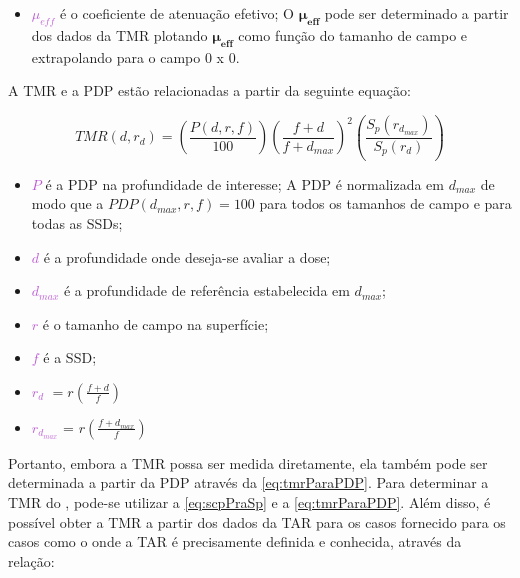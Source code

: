 \documentclass[11pt,a4paper]{article}
\newcounter{exemplo}
\begin{document}
    \begin{exemplo}[onde:]
        \begin{itemize}
            \item \textcolor{MediumOrchid}{$\mu_{eff}$} é o coeficiente de atenuação efetivo; O $\mathbf{\mu_{eff}}$ pode ser determinado a partir dos dados da TMR plotando $\mathbf{\mu_{eff}}$ como função do tamanho de campo e extrapolando para o campo 0 x 0. 
        \end{itemize}
    \end{exemplo}

    A TMR e a PDP estão relacionadas a partir da seguinte equação:

        \begin{equation}
            TMR(d, r_d) = \left(\frac{P(d, r, f)}{100}\right)\left(\frac{f + d}{f + d_{max}}\right)^2 \left(\frac{S_p(r_{d_{max}})}{S_p(r_{d})}\right)
            \label{eq:tmrParaPDP}
        \end{equation}

        \begin{exemplo}[onde:]
            \begin{itemize}
                \item \textcolor{MediumOrchid}{$P$} é a PDP na profundidade de interesse; A PDP é normalizada em $d_{max}$ de modo que a $PDP(d_{max}, r, f) = 100$ para todos os tamanhos de campo e para todas as SSDs;
                \item \textcolor{MediumOrchid}{$d$} é a profundidade onde deseja-se avaliar a dose;
                \item \textcolor{MediumOrchid}{$d_{max}$} é a profundidade de referência estabelecida em $d_{max}$; 
                \item \textcolor{MediumOrchid}{$r$} é o tamanho de campo na superfície;
                \item \textcolor{MediumOrchid}{$f$} é a SSD;
                \item \textcolor{MediumOrchid}{$r_d$} $= r \left(\frac{f + d}{f}\right)$
                \item \textcolor{MediumOrchid}{$r_{d_{max}}$} = $r\left(\frac{f + d_{max}}{f}\right)$
            \end{itemize}
        \end{exemplo}

    Portanto, embora a TMR possa ser medida diretamente, ela também pode ser determinada a partir da PDP através da \ref{eq:tmrParaPDP}. Para determinar a TMR do , pode-se utilizar a \ref{eq:scpPraSp}  e a \ref{eq:tmrParaPDP}. Além disso, é possível obter a TMR a partir dos dados da TAR para os casos fornecido para os casos como o  onde a TAR é precisamente definida e conhecida, através da relação:
\end{document}
